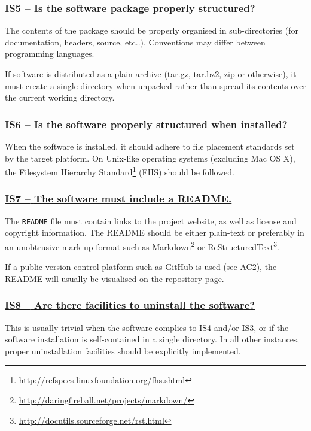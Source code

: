 \documentclass[a4paper,11pt]{article}
\newcommand{\criterion}[1]{\subsubsection*{\underline{#1}}}
\begin{document}
\newcommand{\isFiveID}{IS5}
\newcommand{\isFiveText}{Is the software package properly structured?}
\criterion{\isFiveID{ }--{ }\isFiveText}\label{id:is5} 

The contents of the package should be properly organised in sub-directories
(for documentation, headers, source, etc..). Conventions may differ between
programming languages.

If software is distributed as a plain archive (tar.gz, tar.bz2, zip or otherwise),
it must create a single directory when unpacked rather than spread its contents
over the current working directory.

\newcommand{\isSixID}{IS6}
\newcommand{\isSixText}{Is the software properly structured when installed?}
\criterion{\isSixID{ }--{ }\isSixText}\label{id:is6} 

When the software is installed, it should adhere to file placement standards set
by the target platform. On Unix-like operating systems (excluding Mac OS X), the Filesystem
Hierarchy Standard\footnote{\url{http://refspecs.linuxfoundation.org/fhs.shtml}} (FHS) should be followed.

\newcommand{\isSevenID}{IS7}
\newcommand{\isSevenText}{The software must include a README.}
\criterion{\isSevenID{ }--{ }\isSevenText}\label{id:is7} 

The \texttt{README} file must contain links to the project website, as well as
license and copyright information. The README should be either plain-text or
preferably in an unobtrusive mark-up format such as
Markdown\footnote{\url{http://daringfireball.net/projects/markdown/}} or
ReStructuredText\footnote{\url{http://docutils.sourceforge.net/rst.html}}.

If a public version control platform such as GitHub is used (see AC2), the
README will usually be visualised on the repository page.

\newcommand{\isEightID}{IS8}
\newcommand{\isEightText}{Are there facilities to uninstall the software?}
\criterion{\isEightID{ }--{ }\isEightText}\label{id:is8} 

This is usually trivial when the software complies to IS4 and/or IS3, or if the
software installation is self-contained in a single directory. In all other
instances, proper uninstallation facilities should be explicitly implemented.
\end{document}
